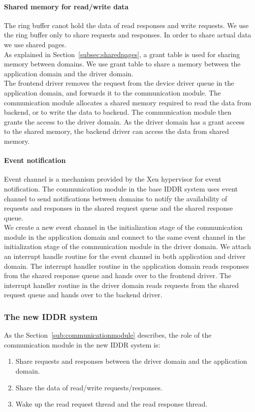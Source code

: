 \paragraph{Shared memory for read/write data}
The ring buffer canot hold the data of read responses and write requests. We use the ring buffer only to share requests and responses. In order to share actual data we use shared pages. 
\\[3mm]
As explained in Section~\ref{subsec:sharedpages}, a grant table is used for sharing memory between domains. We use grant table to share a memory between the application domain and the driver domain.
\\[3mm]
The frontend driver removes the request from the device driver queue in the application domain, and forwards it to the communication module. The communication module allocates a shared memory required to read the data from backend, or to write the data to backend. The communication module then grants the access to the driver domain. As the driver domain has a grant access to the shared memory, the backend driver can access the data from shared memory.

\paragraph{Event notification}
Event channel is a mechanism provided by the Xen hypervisor for event notification. The communication module in the base IDDR system uses event channel to send notifications between domains to notify the availability of requests and responses in the shared request queue and the shared response queue. 
\\[3mm]
We create a new event channel in the initialization stage of the communication module in the application domain and connect to the same event channel in the initialization stage of the communication module in the driver domain. We attach an interrupt handle routine for the event channel in both application and driver domain. The interrupt handler routine in the application domain reads responses from the shared response queue and hands over to the frontend driver. The interrupt handler routine in the driver domain reads requests from the shared request queue and hands over to the backend driver.

\subsubsection*{The new IDDR system}
As the Section~\ref{sub:communicationmodule} describes, the role of the communication module in the new IDDR system is:
\begin{enumerate} 
\item Share requests and responses between the driver domain and the application domain.
\item Share the data of read/write requests/responses.
\item Wake up the read request thread and the read response thread. 
\end{enumerate}
